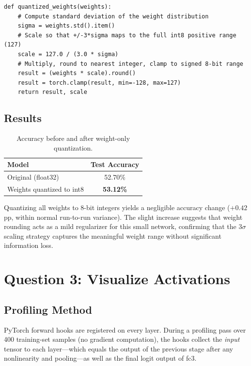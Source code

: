 \documentclass[11pt, letterpaper]{article}
\begin{document}
\begin{lstlisting}[caption={Weight quantization --- \texttt{quantized\_weights}.}]
def quantized_weights(weights):
    # Compute standard deviation of the weight distribution
    sigma = weights.std().item()
    # Scale so that +/-3*sigma maps to the full int8 positive range (127)
    scale = 127.0 / (3.0 * sigma)
    # Multiply, round to nearest integer, clamp to signed 8-bit range
    result = (weights * scale).round()
    result = torch.clamp(result, min=-128, max=127)
    return result, scale
\end{lstlisting}

\subsection{Results}

\begin{table}[H]
  \centering
  \caption{Accuracy before and after weight-only quantization.}
  \begin{tabular}{lc}
    \toprule
    \textbf{Model}                    & \textbf{Test Accuracy} \\
    \midrule
    Original (float32)                & 52.70\%                \\
    Weights quantized to int8         & \textbf{53.12\%}       \\
    \bottomrule
  \end{tabular}
\end{table}

Quantizing all weights to 8-bit integers yields a negligible accuracy change
($+0.42$ pp, within normal run-to-run variance). The slight increase suggests
that weight rounding acts as a mild regularizer for this small network,
confirming that the $3\sigma$ scaling strategy captures the meaningful weight
range without significant information loss.

\section{Question 3: Visualize Activations}

\subsection{Profiling Method}

PyTorch forward hooks are registered on every layer. During a profiling pass
over 400 training-set samples (no gradient computation), the hooks collect
the \emph{input} tensor to each layer---which equals the output of the
previous stage after any nonlinearity and pooling---as well as the final
logit output of fc3.
\end{document}
